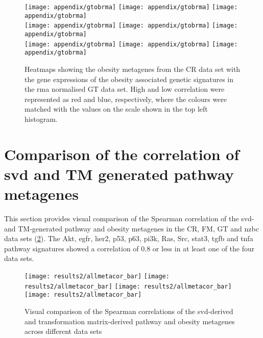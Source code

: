 \begin{appendices}
	\begin{figure}[htp!]
		\centering
		\texttt{[image: appendix/gtobrma]}
		\texttt{[image: appendix/gtobrma]}
		\texttt{[image: appendix/gtobrma]}\\
		\texttt{[image: appendix/gtobrma]}
		\texttt{[image: appendix/gtobrma]}
		\texttt{[image: appendix/gtobrma]}\\
		\texttt{[image: appendix/gtobrma]}
		\texttt{[image: appendix/gtobrma]}
		\texttt{[image: appendix/gtobrma]}\\
		\caption[Heatmaps of all the obesity and the pathway metagenes in the CR, \gls{nzbc} and FM data]{Heatmaps showing the obesity metagenes from the CR data set with the gene expressions of the obesity associated genetic signatures in the \gls{rma} normalised GT data set.
		High and low correlation were represented as red and blue, respectively, where the colours were matched with the values on the scale shown in the top left histogram.}
		\label{fig:appendix/ob_meta_dir_gt}
	\end{figure}

	\newpage

	\section{Comparison of the correlation of \gls{svd} and TM generated pathway metagenes}
	\label{sec:comparison_of_the_correlation_of_svd_and_tm_generated_pathway_metagenes}

	This section provides visual comparison of the Spearman correlation of the \gls{svd}- and TM-generated pathway and obesity metagenes in the CR, FM, GT and \gls{nzbc} data sets (\cref{fig:allmetacor_bar_appendix}).
	The Akt, \gls{egfr}, \gls{her2}, p53, p63, \gls{pi3k}, Ras, Src, \gls{stat3}, \gls{tgfb} and \gls{tnfa} pathway signatures showed a correlation of 0.8 or less in at least one of the four data sets.

	\begin{figure}[htpb]
		\centering
		\texttt{[image: results2/allmetacor\_bar]}
		\texttt{[image: results2/allmetacor\_bar]}
		\texttt{[image: results2/allmetacor\_bar]}
		\texttt{[image: results2/allmetacor\_bar]}\\
		\caption[Bar plots showing the Spearman correlation of the \gls{svd}- and TM-derived obesity and pathway metagenes across different data sets]{Visual comparison of the Spearman correlations of the \gls{svd}-derived and transformation matrix-derived pathway and obesity metagenes across different data sets}
		\label{fig:allmetacor_bar_appendix}
	\end{figure}


\end{appendices}
